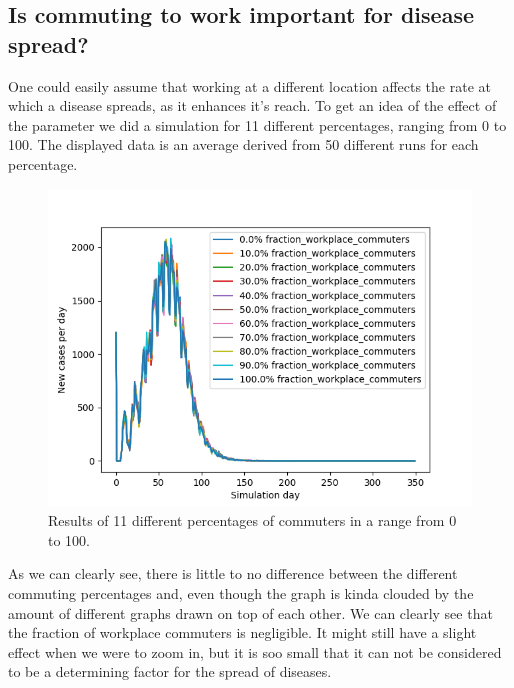 \documentclass[runningheads]{llncs}
\begin{document}
	\subsection{Is commuting to work important for disease spread?}
	One could easily assume that working at a different location affects the rate at which a disease spreads, as it enhances it's reach. To get an idea of the effect of the parameter we did a simulation for 11 different percentages, ranging from 0 to 100. The displayed data is an average derived from 50 different runs for each percentage.
	
	\begin{figure}
		\includegraphics[width=\textwidth]{fraction_workplace_commutersnew_0_100_10.png}
		\caption{Results of 11 different percentages of commuters in a range from 0 to 100.}
	\end{figure}
	
	\noindent
	As we can clearly see, there is little to no difference between the different commuting percentages and, even though the graph is kinda clouded by the amount of different graphs drawn on top of each other. We can clearly see that the fraction of workplace commuters is negligible. It might still have a slight effect when we were to zoom in, but it is soo small that it can not be considered to be a determining factor for the spread of diseases. 
	\newpage
\end{document}
